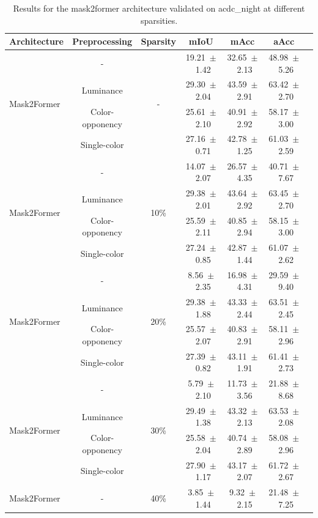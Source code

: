 \begin{table}[h]
\centering
\caption{Results for the mask2former architecture validated on acdc_night at different sparsities.}
\begin{tabular}{@{}lccc ccc@{}}
\toprule
Architecture & Preprocessing & Sparsity & mIoU & mAcc & aAcc \\
\midrule

\multirow{4}{*}{Mask2Former} & - & \multirow{4}{*}{-} & 19.21~$\pm$~1.42 & 32.65~$\pm$~2.13 & 48.98~$\pm$~5.26 \\
& Luminance & & 29.30~$\pm$~2.04 & 43.59~$\pm$~2.91 & 63.42~$\pm$~2.70 \\
& Color-opponency & & 25.61~$\pm$~2.10 & 40.91~$\pm$~2.92 & 58.17~$\pm$~3.00 \\
& Single-color & & 27.16~$\pm$~0.71 & 42.78~$\pm$~1.25 & 61.03~$\pm$~2.59 \\
\midrule
\multirow{4}{*}{Mask2Former} & - & \multirow{4}{*}{10\%} & 14.07~$\pm$~2.07 & 26.57~$\pm$~4.35 & 40.71~$\pm$~7.67 \\
& Luminance & & 29.38~$\pm$~2.01 & 43.64~$\pm$~2.92 & 63.45~$\pm$~2.70 \\
& Color-opponency & & 25.59~$\pm$~2.11 & 40.85~$\pm$~2.94 & 58.15~$\pm$~3.00 \\
& Single-color & & 27.24~$\pm$~0.85 & 42.87~$\pm$~1.44 & 61.07~$\pm$~2.62 \\
\midrule
\multirow{4}{*}{Mask2Former} & - & \multirow{4}{*}{20\%} & 8.56~$\pm$~2.35 & 16.98~$\pm$~4.31 & 29.59~$\pm$~9.40 \\
& Luminance & & 29.38~$\pm$~1.88 & 43.33~$\pm$~2.44 & 63.51~$\pm$~2.45 \\
& Color-opponency & & 25.57~$\pm$~2.07 & 40.83~$\pm$~2.91 & 58.11~$\pm$~2.96 \\
& Single-color & & 27.39~$\pm$~0.82 & 43.11~$\pm$~1.91 & 61.41~$\pm$~2.73 \\
\midrule
\multirow{4}{*}{Mask2Former} & - & \multirow{4}{*}{30\%} & 5.79~$\pm$~2.10 & 11.73~$\pm$~3.56 & 21.88~$\pm$~8.68 \\
& Luminance & & 29.49~$\pm$~1.38 & 43.32~$\pm$~2.13 & 63.53~$\pm$~2.08 \\
& Color-opponency & & 25.58~$\pm$~2.04 & 40.74~$\pm$~2.89 & 58.08~$\pm$~2.96 \\
& Single-color & & 27.90~$\pm$~1.17 & 43.17~$\pm$~2.07 & 61.72~$\pm$~2.67 \\
\midrule
\multirow{4}{*}{Mask2Former} & - & \multirow{4}{*}{40\%} & 3.85~$\pm$~1.44 & 9.32~$\pm$~2.15 & 21.48~$\pm$~7.25 \\

\end{tabular}
\end{table}
